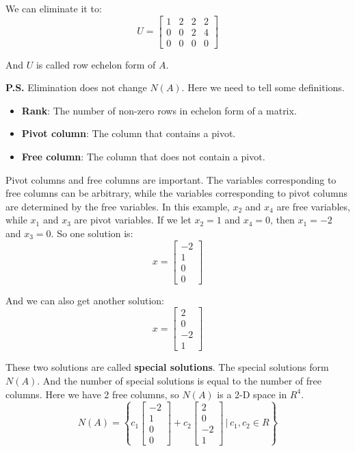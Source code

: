 \documentclass[12pt]{ctexart}
\begin{document}
We can eliminate it to:
\[
  U = \begin{bmatrix}
    1 & 2 & 2 & 2 \\
    0 & 0 & 2 & 4 \\
    0 & 0 & 0 & 0
  \end{bmatrix}
\]

And $U$ is called row echelon form of $A$.

\vspace{0.5em}
\textbf{P.S.} Elimination does not change $N(A)$.
\newpage
Here we need to tell some definitions.
\begin{itemize}
  \item \textbf{Rank}: The number of non-zero rows in echelon form of a matrix.
  \item \textbf{Pivot column}: The column that contains a pivot.
  \item \textbf{Free column}: The column that does not contain a pivot.
\end{itemize}

Pivot columns and free columns are important. The variables corresponding to free
columns can be arbitrary, while the variables corresponding to pivot columns are
determined by the free variables. In this example, $x_2$ and $x_4$ are free variables,
while $x_1$ and $x_3$ are pivot variables. If we let $x_2 = 1$ and $x_4 = 0$, then
$x_1 = -2$ and $x_3 = 0$. So one solution is:
\[
  x = \begin{bmatrix}
    -2 \\ 1 \\ 0 \\ 0
  \end{bmatrix}
\]

And we can also get another solution:
\[
  x = \begin{bmatrix}
    2 \\ 0 \\ -2 \\ 1
  \end{bmatrix}
\]

These two solutions are called \textbf{special solutions}. The special solutions
form $N(A)$. And the number of special solutions is equal to the number of free
columns. Here we have 2 free columns, so $N(A)$ is a 2-D space in $R^{4}$.
\[
  N(A) = \left\{ c_1 \begin{bmatrix} -2 \\ 1 \\ 0 \\ 0 \end{bmatrix} +
               c_2 \begin{bmatrix} 2 \\ 0 \\ -2 \\ 1 \end{bmatrix}
               \,|\, c_1, c_2 \in R \right\}
\]
\end{document}
